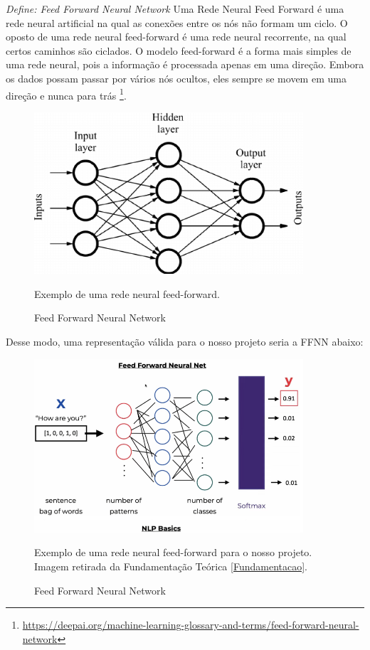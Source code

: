 \textit{Define: Feed Forward Neural Network} Uma Rede Neural Feed Forward é uma rede neural artificial na qual as conexões entre os nós não formam um ciclo. O oposto de uma rede neural feed-forward é uma rede neural recorrente, na qual certos caminhos são ciclados. O modelo feed-forward é a forma mais simples de uma rede neural, pois a informação é processada apenas em uma direção. Embora os dados possam passar por vários nós ocultos, eles sempre se movem em uma direção e nunca para trás \footnote{\url{https://deepai.org/machine-learning-glossary-and-terms/feed-forward-neural-network}}.


\begin{figure}[H]
   \begin{center}
      \includegraphics[width=10cm]{img/ffnn.png}
      \caption{Feed Forward Neural Network} \label{ffnn}
      \medskip
      \small
      Exemplo de uma rede neural feed-forward.
   \end{center}
\end{figure}

Desse modo, uma representação válida para o nosso projeto seria a FFNN abaixo:
\begin{figure}[H]
   \begin{center}
      \includegraphics[width=10cm]{img/ffnn2.png}
      \caption{Feed Forward Neural Network} \label{ffnn2}
      \medskip
      \small
      Exemplo de uma rede neural feed-forward para o nosso projeto. Imagem retirada da Fundamentação Teórica \ref{Fundamentacao}.
   \end{center}
\end{figure}

